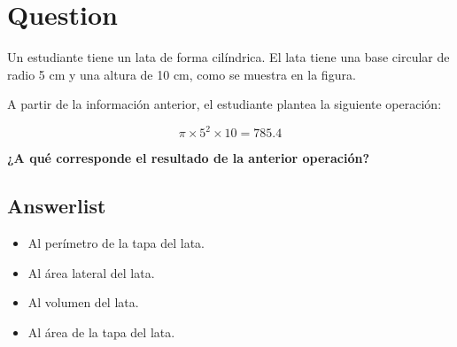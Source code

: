 \documentclass[
]{article}
\author{}
\date{\vspace{-2.5em}}
\providecommand{\tightlist}{%
  \setlength{\itemsep}{0pt}\setlength{\parskip}{0pt}}
\begin{document}
\section{Question}\label{question}

Un estudiante tiene un lata de forma cilíndrica. El lata tiene una base
circular de radio 5 cm y una altura de 10 cm, como se muestra en la
figura.

\begin{center}
\end{center}

A partir de la información anterior, el estudiante plantea la siguiente
operación:

\[\pi \times 5^2 \times 10 = 785.4\]

\textbf{¿A qué corresponde el resultado de la anterior operación?}

\subsection{Answerlist}\label{answerlist}

\begin{itemize}
\tightlist
\item
  Al perímetro de la tapa del lata.
\item
  Al área lateral del lata.
\item
  Al volumen del lata.
\item
  Al área de la tapa del lata.
\end{itemize}
\end{document}
